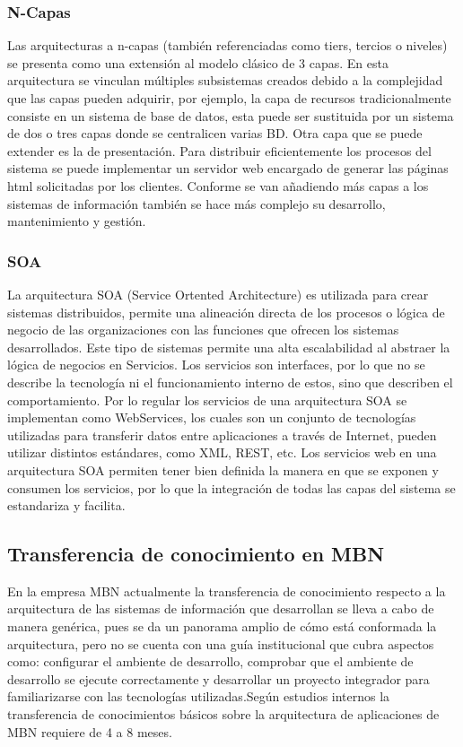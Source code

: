 \subsubsection{ N-Capas }
 Las arquitecturas a n-capas (también referenciadas como tiers, tercios o niveles) se presenta como una extensión al modelo clásico de 3 capas. En esta arquitectura se vinculan múltiples subsistemas creados debido a la complejidad que las capas pueden adquirir, por ejemplo, la capa de recursos tradicionalmente consiste en un sistema de base de datos, esta puede ser sustituida por un sistema de dos o tres capas donde se centralicen varias BD. Otra capa que se puede extender es la de presentación. Para distribuir eficientemente los procesos del sistema se puede implementar un servidor web encargado de generar las páginas html solicitadas por los clientes.
Conforme se van añadiendo más capas a los sistemas de información también se hace más complejo su desarrollo, mantenimiento y gestión.

\subsubsection{ SOA }
La arquitectura SOA (Service Ortented Architecture) es utilizada para crear sistemas distribuidos, permite una alineación directa de los procesos o lógica de negocio de las organizaciones con las funciones que ofrecen los sistemas desarrollados. Este tipo de sistemas permite una alta escalabilidad al  abstraer la lógica de negocios en Servicios. Los servicios son interfaces, por lo que no se describe la tecnología ni el funcionamiento interno de estos, sino que describen el comportamiento. Por lo regular  los servicios de una arquitectura SOA se implementan como WebServices, los cuales son un conjunto de tecnologías utilizadas para transferir datos entre aplicaciones a través de Internet, pueden utilizar distintos estándares, como XML, REST, etc.
Los servicios web en una arquitectura SOA permiten tener bien definida la manera en que se exponen y consumen los servicios, por lo que la integración de todas las capas del sistema se estandariza y facilita.

\subsection{ Transferencia de conocimiento en MBN }
En la empresa MBN actualmente la transferencia de conocimiento respecto a la arquitectura de las sistemas de información que desarrollan se lleva a cabo de manera genérica, pues se da un panorama amplio de cómo está conformada la arquitectura, pero no se cuenta con una guía institucional que cubra aspectos como: configurar el ambiente de desarrollo, comprobar que el ambiente de desarrollo se ejecute correctamente y desarrollar un proyecto integrador para familiarizarse con las tecnologías utilizadas.Según estudios internos la transferencia de conocimientos básicos sobre la arquitectura de aplicaciones de MBN requiere de 4 a 8 meses.

